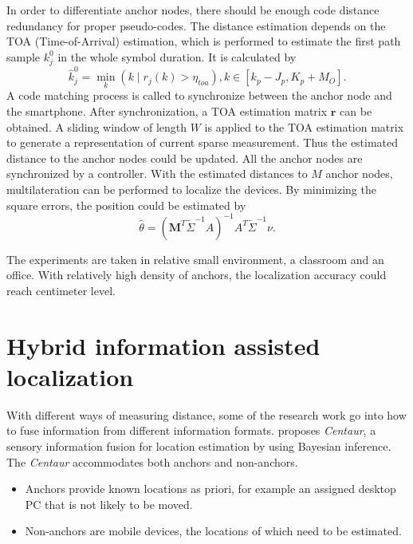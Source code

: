 \documentclass[letterpaper]{article}
\begin{document}
In order to differentiate anchor nodes, there should be enough code distance redundancy for proper pseudo-codes.
The distance estimation depends on the TOA (Time-of-Arrival) estimation, which is performed to estimate the first path sample $ k^{0}_{j} $ in the whole symbol duration.
It is calculated by
\begin{equation}
\hat{k}^{0}_{j} = \min_{k} ( k \mid r_{j} (k) > \eta_{toa} ) , k \in [ k_{p} - J_{p}, K_{p} + M_{O}  ].
\end{equation}
A code matching process is called to synchronize between the anchor node and the smartphone.
After synchronization, a TOA estimation matrix $ \mathbf{r} $ can be obtained.
A sliding window of length $ W $  is applied to the TOA estimation matrix to generate a representation of current sparse measurement.
Thus the estimated distance to the anchor nodes could be updated.
All the anchor nodes are synchronized by a controller.
With the estimated distances to $ M $ anchor nodes, multilateration can be performed to localize the devices.	
By minimizing the square errors, the position could be estimated by
\begin{equation}
\hat{\theta} = (\mathbf{M}^{T} \tilde{\Sigma}^{-1} A )^{-1} A^{T} \tilde{\Sigma}^{-1} \nu.
\end{equation}

The experiments are taken in relative small environment, a classroom and an office.
With relatively high density of anchors, the localization accuracy could reach centimeter level.


\section{Hybrid information assisted localization}

With different ways of measuring distance, some of the research work go into how to fuse information from different information formats.
\cite{Nandakumar:2012:CLD:2348543.2348579} proposes \emph{Centaur}, a sensory information fusion for location estimation by using Bayesian inference.
The \emph{Centaur} accommodates both anchors and non-anchors.
\begin{itemize}
\item Anchors provide known locations as priori, for example an assigned desktop PC that is not likely to be moved.
\item Non-anchors are mobile devices, the locations of which need to be estimated.
\end{itemize}
\end{document}
